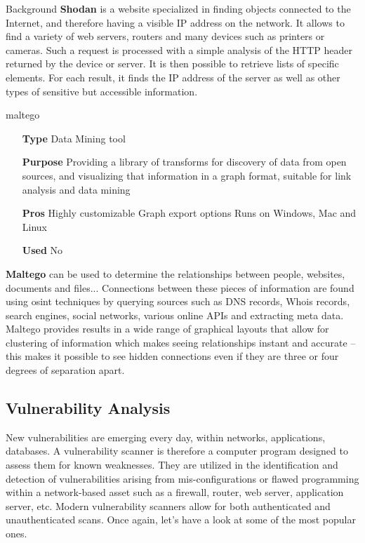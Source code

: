 \begin{chaptercover}{Background}
\textbf{Shodan} \cite{shodan} is a website specialized in finding objects connected to the Internet, and therefore having a visible IP address on the network. It allows to find a variety of web servers, routers and many devices such as printers or cameras. Such a request is processed with a simple analysis of the HTTP header returned by the device or server. It is then possible to retrieve lists of specific elements. For each result, it finds the IP address of the server as well as other types of sensitive but accessible information.

\begin{solutiondata}{maltego}
\begin{itemize}[labelsep=1cm]
  \item [\textbf{Type}] Data Mining tool
  \item [\textbf{Purpose}] Providing a library of transforms for discovery of data from open sources, and visualizing that information in a graph format, suitable for link analysis and data mining
  \item [\textbf{Pros}] Highly customizable \newline Graph export options \newline Runs on Windows, Mac and Linux
  \item [\textbf{Used}] No
\end{itemize}
\end{solutiondata}

\textbf{Maltego} \cite{maltego} can be used to determine the relationships between people, websites, documents and files... Connections between these pieces of information are found using \acrfull{osint} techniques by querying sources such as DNS records, Whois records, search engines, social networks, various online APIs and extracting meta data. Maltego provides results in a wide range of graphical layouts that allow for clustering of information which makes seeing relationships instant and accurate – this makes it possible to see hidden connections even if they are three or four degrees of separation apart.

\subsection{Vulnerability Analysis}

New vulnerabilities are emerging every day, within networks, applications, databases. A vulnerability scanner is therefore a computer program designed to assess them for known weaknesses. They are utilized in the identification and detection of vulnerabilities arising from mis-configurations or flawed programming within a network-based asset such as a firewall, router, web server, application server, etc. Modern vulnerability scanners allow for both authenticated and unauthenticated scans. Once again, let’s have a look at some of the most popular ones.


\end{chaptercover}
